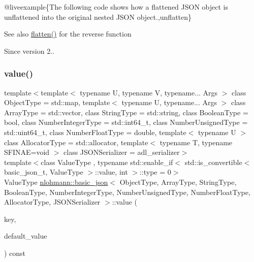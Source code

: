 @liveexample\{The following code shows how a flattened J\+S\+ON object is unflattened into the original nested J\+S\+ON object.,unflatten\}

\begin{DoxySeeAlso}{See also}
\mbox{\hyperlink{classnlohmann_1_1basic__json_ab838f000d76662917ffd6ec529569e03}{flatten()}} for the reverse function
\end{DoxySeeAlso}
\begin{DoxySince}{Since}
version 2.. 
\end{DoxySince}
\mbox{\label{classnlohmann_1_1basic__json_af9c51328fbe1da75eca750be3009917a}} 
\subsubsection{\texorpdfstring{value()}{value()}\hspace{0.1cm}{\footnotesize\ttfamily [1/4]}}
{\footnotesize\ttfamily template$<$template$<$ typename U, typename V, typename... Args $>$ class Object\+Type = std\+::map, template$<$ typename U, typename... Args $>$ class Array\+Type = std\+::vector, class String\+Type  = std\+::string, class Boolean\+Type  = bool, class Number\+Integer\+Type  = std\+::int64\+\_\+t, class Number\+Unsigned\+Type  = std\+::uint64\+\_\+t, class Number\+Float\+Type  = double, template$<$ typename U $>$ class Allocator\+Type = std\+::allocator, template$<$ typename T, typename S\+F\+I\+N\+A\+E=void $>$ class J\+S\+O\+N\+Serializer = adl\+\_\+serializer$>$ \\
template$<$class Value\+Type , typename std\+::enable\+\_\+if$<$ std\+::is\+\_\+convertible$<$ basic\+\_\+json\+\_\+t, Value\+Type $>$\+::value, int $>$\+::type  = 0$>$ \\
Value\+Type \mbox{\hyperlink{classnlohmann_1_1basic__json}{nlohmann\+::basic\+\_\+json}}$<$ Object\+Type, Array\+Type, String\+Type, Boolean\+Type, Number\+Integer\+Type, Number\+Unsigned\+Type, Number\+Float\+Type, Allocator\+Type, J\+S\+O\+N\+Serializer $>$\+::value (\begin{DoxyParamCaption}\item[{const typename object\+\_\+t\+::key\+\_\+type \&}]{key,  }\item[{Value\+Type}]{default\+\_\+value }\end{DoxyParamCaption}) const\hspace{0.3cm}{\ttfamily [inline]}}



